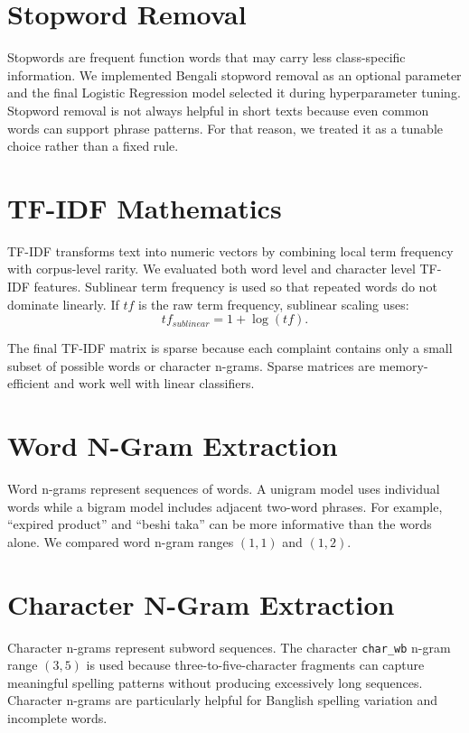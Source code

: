 \documentclass[12pt,a4paper,openany]{book}
\begin{document}
\section{Stopword Removal}
Stopwords are frequent function words that may carry less class-specific information. We implemented Bengali stopword removal as an optional parameter and the final Logistic Regression model selected it during hyperparameter tuning. Stopword removal is not always helpful in short texts because even common words can support phrase patterns. For that reason, we treated it as a tunable choice rather than a fixed rule.

\section{TF-IDF Mathematics}
TF-IDF transforms text into numeric vectors by combining local term frequency with corpus-level rarity. We evaluated both word level and character level TF-IDF features. Sublinear term frequency is used so that repeated words do not dominate linearly. If $tf$ is the raw term frequency, sublinear scaling uses:
\begin{equation}
tf_{sublinear}=1+\log(tf).
\end{equation}

The final TF-IDF matrix is sparse because each complaint contains only a small subset of possible words or character n-grams. Sparse matrices are memory-efficient and work well with linear classifiers.

\section{Word N-Gram Extraction}
Word n-grams represent sequences of words. A unigram model uses individual words while a bigram model includes adjacent two-word phrases. For example, ``expired product'' and ``beshi taka'' can be more informative than the words alone. We compared word n-gram ranges $(1,1)$ and $(1,2)$.

\section{Character N-Gram Extraction}
Character n-grams represent subword sequences. The character \texttt{char\_wb} n-gram range $(3,5)$ is used because three-to-five-character fragments can capture meaningful spelling patterns without producing excessively long sequences. Character n-grams are particularly helpful for Banglish spelling variation and incomplete words.
\end{document}
